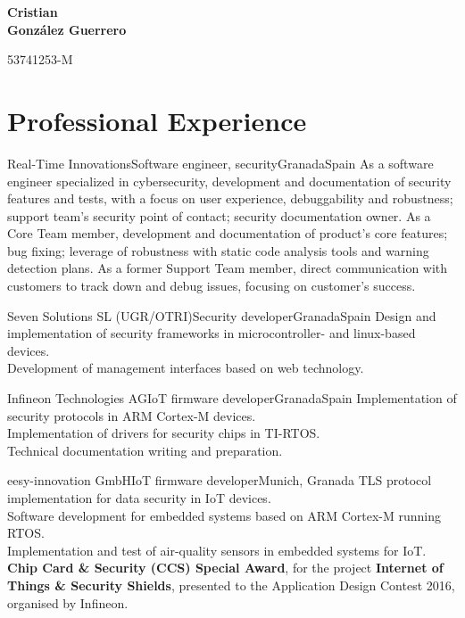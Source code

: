 \documentclass[11pt,a4paper,sans,spanish]{moderncv}
\begin{document}
\begin{minipage}[c]{\textwidth-100pt-0.5em}
    \begin{flushright}
        \textbf{\Huge{Cristian\\\vspace{4pt}González Guerrero}}

        \vspace{4pt}
        \small{53741253-M}
    \end{flushright}
\end{minipage}
\vspace{-5em}

\makecvtitle

\section{Professional Experience}

{Real-Time Innovations}{Software engineer, security}{Granada}{Spain}
{As a software engineer specialized in cybersecurity, development and
documentation of security features and tests, with a focus on user experience,
debuggability and robustness; support team's security point of contact;
security documentation owner.
As a Core Team member, development and documentation of product's core
features; bug fixing; leverage of robustness with static code analysis tools
and warning detection plans.
As a former Support Team member, direct communication with customers to track
down and debug issues, focusing on customer's success.
}

{Seven Solutions SL (UGR/OTRI)}{Security developer}{Granada}{Spain}
{Design and implementation of security frameworks in microcontroller- and
linux-based devices.\\ Development of management interfaces based on web
technology.\\
}

{Infineon Technologies AG}{IoT firmware developer}{Granada}{Spain}
{Implementation of security protocols in ARM Cortex-M devices.\\
Implementation of drivers for security chips in TI-RTOS.\\
Technical documentation writing and preparation.
}

{eesy-innovation GmbH}{IoT firmware developer}{Munich, Granada}{}
{TLS protocol implementation for data security in IoT devices.\\
Software development for embedded systems based on ARM Cortex-M running RTOS.\\
Implementation and test of air-quality sensors in embedded systems for IoT.\\
\textbf{Chip Card \& Security (CCS) Special Award}, for the project
\textbf{Internet of Things \& Security Shields}, presented to the Application
Design Contest 2016, organised by Infineon.
}
\end{document}
